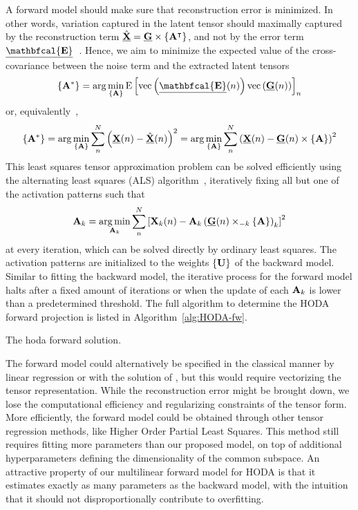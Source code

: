 A forward model should make sure that reconstruction error is minimized.
In other words, variation captured in the latent tensor should maximally captured by the
reconstruction term $\hat{\ten{X}}= \ten{G}\mmpr{\mat{A}^\intercal}$, and not by the error term
$\ten{\mathbfcal{E}}$~\cite{Haufe2014}.
Hence, we aim to minimize the expected value of the cross-covariance between
the noise term and the extracted latent tensors
\begin{equation}
	\left\{\mat{A}^*\right\} = \arg\min_{\{\mat{A}\}}\text{E}\left[\text{vec}\left({\ten{\mathbfcal{E}}(n)}\right)\text{vec}\left({\ten{G}(n)}\right)\right]_n
\end{equation}
or, equivalently~\cite{Parra2005,Haufe2014},
\begin{equation}
	\left\{\mat{A}^*\right\} = \arg\min_{\{\mat{A}\}}\sum_n^N\left(\ten{X}(n)
  -\hat{\ten{X}}(n)\right)^2
  = \arg\min_{\{\mat{A}\}}\sum_n^N\left(\ten{X}(n) - \ten{G}(n)\mmpr{\mat{A}}\right)^2
\end{equation}
This least squares tensor approximation problem can be solved efficiently using the
alternating least squares (ALS) algorithm~\cite{Bentbib2022},%
iteratively fixing all but one of the activation patterns such that
\begin{equation}
	\mat{A}_k = \argmin_{\mat{A}_k}
	\sum_n^N\left[\mat{X}_k(n) -
		\mat{A}_k\left(\ten{G}(n)\mmprs{\mat{A}}{k}\right)_k\right]^2
\end{equation}
at every iteration, which can be solved directly by ordinary least squares.
The activation patterns are initialized to the weights $\{\mat{U}\}$ of the
backward model.
Similar to fitting the backward model, the iterative process for the forward
model halts after a fixed amount of iterations or when the update of each
$\mat{A}_k$ is lower than a predetermined threshold.
The full algorithm to determine the HODA forward projection is listed
in Algorithm~\ref{alg:HODA-fw}.
\begin{algorithm}
  \caption[The \ac{hoda} forward solution.]{The \ac{hoda} forward solution.}
	\label{alg:HODA-fw}
	
\end{algorithm}

The forward model could alternatively be specified in the classical manner by linear
regression or with the solution of \textcite{Haufe2014}, but this would require
vectorizing the tensor representation.
While the reconstruction error might be brought down, we lose the computational
efficiency and regularizing constraints of the tensor form.
More efficiently, the forward model could be obtained through other tensor
regression methods, like Higher Order Partial
Least Squares.
This method still requires fitting more parameters than our
proposed model, on top of additional hyperparameters defining the
dimensionality of the common subspace.
An attractive property of our multilinear forward model for HODA is that it
estimates exactly as many parameters as the backward model, with the intuition that
it should not disproportionally contribute to overfitting.

